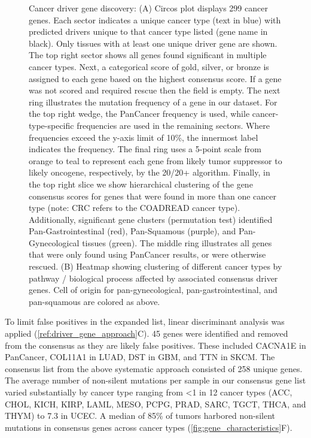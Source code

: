\begin{figure}
  \caption[Cancer driver gene discovery]{Cancer driver gene discovery: (A) Circos \cite{RN182} plot displays 299 cancer genes. Each sector indicates a unique cancer type (text in blue) with predicted drivers unique to that cancer type listed (gene name in black). Only tissues with at least one unique driver gene are shown. The top right sector shows all genes found significant in multiple cancer types. Next, a categorical score of gold, silver, or bronze is assigned to each gene based on the highest consensus score. If a gene was not scored and required rescue then the field is empty. The next ring illustrates the mutation frequency of a gene in our dataset. For the top right wedge, the PanCancer frequency is used, while cancer-type-specific frequencies are used in the remaining sectors. Where frequencies exceed the y-axis limit of 10\%, the innermost label indicates the frequency. The final ring uses a 5-point scale from orange to teal to represent each gene from likely tumor suppressor to likely oncogene, respectively, by the 20/20+ algorithm. Finally, in the top right slice we show hierarchical clustering of the gene consensus scores for genes that were found in more than one cancer type (note: CRC refers to the COADREAD cancer type). Additionally, significant gene clusters (permutation test) identified Pan-Gastrointestinal (red), Pan-Squamous (purple), and Pan-Gynecological tissues (green). The middle ring illustrates all genes that were only found using PanCancer results, or were otherwise rescued. (B) Heatmap showing clustering of different cancer types by pathway / biological process affected by associated consensus driver genes. Cell of origin for pan-gynecological, pan-gastrointestinal, and pan-squamous are colored as above.}
  \label{fig:gene_discovery}
\end{figure}

To limit false positives in the expanded list, linear discriminant analysis was applied (\autoref{ref:driver_gene_approach}C). 45 genes were identified and removed from the consensus as they are likely false positives. These included CACNA1E in PanCancer, COL11A1 in LUAD, DST in GBM, and TTN in SKCM. The consensus list from the above systematic approach consisted of 258 unique genes. The average number of non-silent mutations per sample in our consensus gene list varied substantially by cancer type ranging from <1 in 12 cancer types (ACC, CHOL, KICH, KIRP, LAML, MESO, PCPG, PRAD, SARC, TGCT, THCA, and THYM) to 7.3 in UCEC. A median of 85\% of tumors harbored non-silent mutations in consensus genes across cancer types (\autoref{fig:gene_characteristics}F). 

